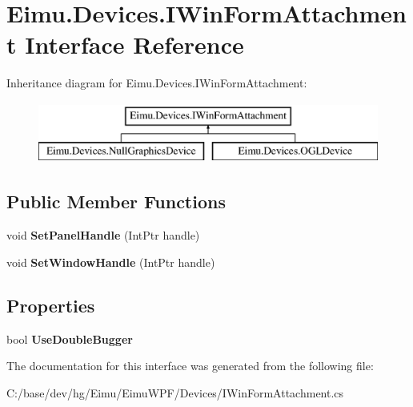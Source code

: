 \hypertarget{interface_eimu_1_1_devices_1_1_i_win_form_attachment}{
\section{Eimu.Devices.IWinFormAttachment Interface Reference}
\label{interface_eimu_1_1_devices_1_1_i_win_form_attachment}
}
Inheritance diagram for Eimu.Devices.IWinFormAttachment:\begin{figure}[H]
\begin{center}
\leavevmode
\includegraphics[height=2.000000cm]{interface_eimu_1_1_devices_1_1_i_win_form_attachment}
\end{center}
\end{figure}
\subsection*{Public Member Functions}
\begin{DoxyCompactItemize}
\item 
\hypertarget{interface_eimu_1_1_devices_1_1_i_win_form_attachment_aa8e181d8804796f828462796cc67e504}{
void {\bfseries SetPanelHandle} (IntPtr handle)}
\label{interface_eimu_1_1_devices_1_1_i_win_form_attachment_aa8e181d8804796f828462796cc67e504}

\item 
\hypertarget{interface_eimu_1_1_devices_1_1_i_win_form_attachment_a977f38ce4162ea503af542137f08a474}{
void {\bfseries SetWindowHandle} (IntPtr handle)}
\label{interface_eimu_1_1_devices_1_1_i_win_form_attachment_a977f38ce4162ea503af542137f08a474}

\end{DoxyCompactItemize}
\subsection*{Properties}
\begin{DoxyCompactItemize}
\item 
\hypertarget{interface_eimu_1_1_devices_1_1_i_win_form_attachment_a5242c77ecb3ea8c687c50bd2f13a731f}{
bool {\bfseries UseDoubleBugger}}
\label{interface_eimu_1_1_devices_1_1_i_win_form_attachment_a5242c77ecb3ea8c687c50bd2f13a731f}

\end{DoxyCompactItemize}


The documentation for this interface was generated from the following file:\begin{DoxyCompactItemize}
\item 
C:/base/dev/hg/Eimu/EimuWPF/Devices/IWinFormAttachment.cs\end{DoxyCompactItemize}
